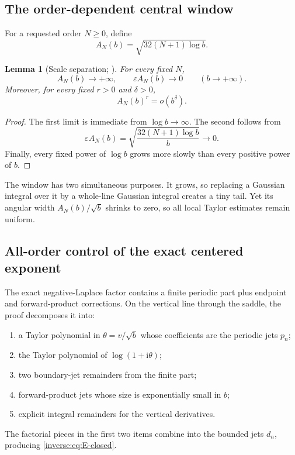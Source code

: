 \documentclass[11pt,oneside]{article}
\newtheorem{lemma}[theorem]{Lemma}
\theoremstyle{definition}
\theoremstyle{remark}
\newcommand{\ii}{\mathrm i}
\begin{document}
\subsection{The order-dependent central window}

For a requested order $N\geq0$, define
\begin{equation}
 A_N(b)=\sqrt{32(N+1)\log b}. \label{inverse:eq:central-radius}
\end{equation}

\begin{lemma}[Scale separation; \Formalized]
\label{inverse:lem:central-scale}
For every fixed $N$,
\[
 A_N(b)\longrightarrow+\infty,\qquad
 \varepsilon A_N(b)\longrightarrow0
 \qquad(b\to+\infty).
\]
Moreover, for every fixed $r>0$ and $\delta>0$,
\[
 A_N(b)^r=o(b^\delta).
\]
\end{lemma}

\begin{proof}
The first limit is immediate from $\log b\to\infty$.  The second follows
from
\[
 \varepsilon A_N(b)
 =\sqrt{\frac{32(N+1)\log b}{b}}\longrightarrow0.
\]
Finally, every fixed power of $\log b$ grows more slowly than every
positive power of $b$.
\end{proof}

The window has two simultaneous purposes.  It grows, so replacing a
Gaussian integral over it by a whole-line Gaussian integral creates a
tiny tail.  Yet its angular width
$A_N(b)/\sqrt b$ shrinks to zero, so all local Taylor estimates remain
uniform.

\subsection{All-order control of the exact centered exponent}

The exact negative-Laplace factor contains a finite periodic part plus
endpoint and forward-product corrections.  On the vertical line through
the saddle, the proof decomposes it into:
\begin{enumerate}
\item a Taylor polynomial in $\theta=v/\sqrt b$ whose coefficients are
the periodic jets $p_n$;
\item the Taylor polynomial of $\log(1+\ii\theta)$;
\item two boundary-jet remainders from the finite part;
\item forward-product jets whose size is exponentially small in $b$;
\item explicit integral remainders for the vertical derivatives.
\end{enumerate}
The factorial pieces in the first two items combine into the bounded
jets $d_n$, producing \eqref{inverse:eq:E-closed}.
\end{document}
